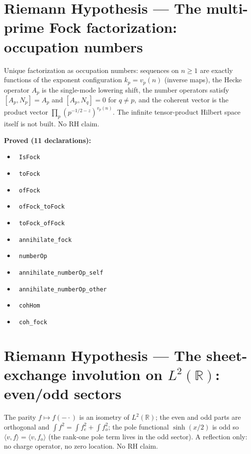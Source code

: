 \documentclass{report}
\theoremstyle{definition}
\begin{document}
\section{Riemann Hypothesis --- The multi-prime Fock factorization: occupation numbers}
Unique factorization as occupation numbers: sequences on $n\ge1$ are exactly functions of the exponent configuration $k_p=v_p(n)$ (inverse maps), the Hecke operator $A_p$ is the single-mode lowering shift, the number operators satisfy $[A_p,N_p]=A_p$ and $[A_p,N_q]=0$ for $q\ne p$, and the coherent vector is the product vector $\prod_p(p^{-1/2-z})^{v_p(n)}$. The infinite tensor-product Hilbert space itself is not built. No RH claim.

\noindent\textbf{Proved (11 declarations):}
\begin{itemize}
  \item {}\leanok\ \texttt{IsFock}
  \item {}\leanok\ \texttt{toFock}
  \item {}\leanok\ \texttt{ofFock}
  \item {}\leanok\ \texttt{ofFock\_toFock}
  \item {}\leanok\ \texttt{toFock\_ofFock}
  \item {}\leanok\ \texttt{annihilate\_fock}
  \item {}\leanok\ \texttt{numberOp}
  \item {}\leanok\ \texttt{annihilate\_numberOp\_self}
  \item {}\leanok\ \texttt{annihilate\_numberOp\_other}
  \item {}\leanok\ \texttt{cohHom}
  \item {}\leanok\ \texttt{coh\_fock}
\end{itemize}

\section{Riemann Hypothesis --- The sheet-exchange involution on $L^2(\mathbb R)$: even/odd sectors}
The parity $f\mapsto f(-\cdot)$ is an isometry of $L^2(\mathbb R)$; the even and odd parts are orthogonal and $\int f^2=\int f_e^2+\int f_o^2$; the pole functional $\sinh(x/2)$ is odd so $\langle v,f\rangle=\langle v,f_o\rangle$ (the rank-one pole term lives in the odd sector). A reflection only: no charge operator, no zero location. No RH claim.
\end{document}
